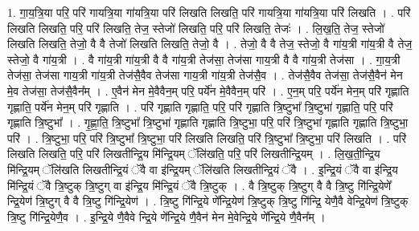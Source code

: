 \documentclass[17pt]{extarticle}
\begin{document}
1. गा॒य॒त्रि॒या परि॒ परि॑ गायत्रि॒या गा॑यत्रि॒या परि॑ लिखति लिखति॒ परि॑ गायत्रि॒या गा॑यत्रि॒या परि॑ लिखति । . परि॑ लिखति लिखति॒ परि॒ परि॑ लिखति॒ तेज॒ स्तेजो॑ लिखति॒ परि॒ परि॑ लिखति॒ तेजः॑ । . लि॒ख॒ति॒ तेज॒ स्तेजो॑ लिखति लिखति॒ तेजो॒ वै वै तेजो॑ लिखति लिखति॒ तेजो॒ वै । . तेजो॒ वै वै तेज॒ स्तेजो॒ वै गा॑य॒त्री गा॑य॒त्री वै तेज॒ स्तेजो॒ वै गा॑य॒त्री । . वै गा॑य॒त्री गा॑य॒त्री वै वै गा॑य॒त्री तेज॑सा॒ तेज॑सा गाय॒त्री वै वै गा॑य॒त्री तेज॑सा । . गा॒य॒त्री तेज॑सा॒ तेज॑सा गाय॒त्री गा॑य॒त्री तेज॑सै॒वैव तेज॑सा गाय॒त्री गा॑य॒त्री तेज॑सै॒व । . तेज॑सै॒वैव तेज॑सा॒ तेज॑सै॒वैन॑ मेन मे॒व तेज॑सा॒ तेज॑सै॒वैन᳚म् । . ए॒वैन॑ मेन मे॒वैवैन॒म् परि॒ पर्ये॑न मे॒वैवैन॒म् परि॑ । . ए॒न॒म् परि॒ पर्ये॑न मेन॒म् परि॑ गृह्णाति गृह्णाति॒ पर्ये॑न मेन॒म् परि॑ गृह्णाति । . परि॑ गृह्णाति गृह्णाति॒ परि॒ परि॑ गृह्णाति त्रि॒ष्टुभा᳚ त्रि॒ष्टुभा॑ गृह्णाति॒ परि॒ परि॑ गृह्णाति त्रि॒ष्टुभा᳚ । . गृ॒ह्णा॒ति॒ त्रि॒ष्टुभा᳚ त्रि॒ष्टुभा॑ गृह्णाति गृह्णाति त्रि॒ष्टुभा॒ परि॒ परि॑ त्रि॒ष्टुभा॑ गृह्णाति गृह्णाति त्रि॒ष्टुभा॒ परि॑ । . त्रि॒ष्टुभा॒ परि॒ परि॑ त्रि॒ष्टुभा᳚ त्रि॒ष्टुभा॒ परि॑ लिखति लिखति॒ परि॑ त्रि॒ष्टुभा᳚ त्रि॒ष्टुभा॒ परि॑ लिखति । . परि॑ लिखति लिखति॒ परि॒ परि॑ लिखतीन्द्रि॒य मि॑न्द्रि॒यम् ॅलि॑खति॒ परि॒ परि॑ लिखतीन्द्रि॒यम् । . लि॒ख॒ती॒न्द्रि॒य मि॑न्द्रि॒यम् ॅलि॑खति लिखतीन्द्रि॒यं ॅवै वा इ॑न्द्रि॒यम् ॅलि॑खति लिखतीन्द्रि॒यं ॅवै । . इ॒न्द्रि॒यं ॅवै वा इ॑न्द्रि॒य मि॑न्द्रि॒यं ॅवै त्रि॒ष्टुक् त्रि॒ष्टुग् वा इ॑न्द्रि॒य मि॑न्द्रि॒यं ॅवै त्रि॒ष्टुक् । . वै त्रि॒ष्टुक् त्रि॒ष्टुग् वै वै त्रि॒ष्टु गि॑न्द्रि॒येणे᳚ न्द्रि॒येण॑ त्रि॒ष्टुग् वै वै त्रि॒ष्टु गि॑न्द्रि॒येण॑ । . त्रि॒ष्टु गि॑न्द्रि॒ये णे᳚न्द्रि॒येण॑ त्रि॒ष्टुक् त्रि॒ष्टु गि॑न्द्रि॒ येणै॒वै वेन्द्रि॒येण॑ त्रि॒ष्टुक् त्रि॒ष्टु गि॑न्द्रि॒येणै॒व । . इ॒न्द्रि॒ये णै॒वैवे न्द्रि॒ये णे᳚न्द्रि॒ये णै॒वैन॑ मेन मे॒वेन्द्रि॒ये णे᳚न्द्रि॒ये णै॒वैन᳚म् । \newline
\end{document}
